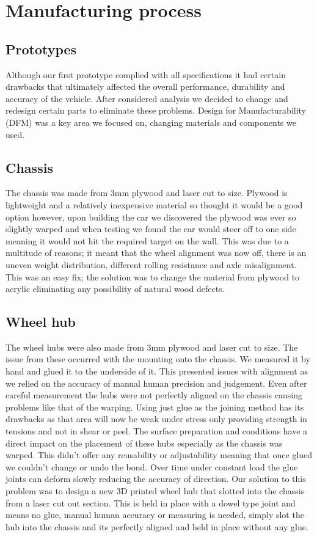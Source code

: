 \documentclass{article}
\begin{document}
\newpage
\section{Manufacturing process}

\subsection{Prototypes}
Although our first prototype complied with all specifications it had certain drawbacks that ultimately affected the overall performance, durability and accuracy of the vehicle. After considered analysis we decided to change and redesign certain parts to eliminate these problems. Design for Manufacturability (DFM) was a key area we focused on, changing materials and components we used. 
\subsection{Chassis}
The chassis was made from 3mm plywood and laser cut to size. Plywood is lightweight and a relatively inexpensive material so thought it would be a good option however, upon building the car we discovered the plywood was ever so slightly warped and when testing we found the car would steer off to one side meaning it would not hit the required target on the wall. This was due to a multitude of reasons; it meant that the wheel alignment was now off, there is an uneven weight distribution, different rolling resistance and axle misalignment. This was an easy fix; the solution was to change the material from plywood to acrylic eliminating any possibility of natural wood defects.  
\subsection{Wheel hub}
The wheel hubs were also made from 3mm plywood and laser cut to size. The issue from these occurred with the mounting onto the chassis. We measured it by hand and glued it to the underside of it. This presented issues with alignment as we relied on the accuracy of manual human precision and judgement. Even after careful measurement the hubs were not perfectly aligned on the chassis causing problems like that of the warping. Using just glue as the joining method has its drawbacks as that area will now be weak under stress only providing strength in tensions and not in shear or peel. The surface preparation and conditions have a direct impact on the placement of these hubs especially as the chassis was warped. This didn't offer any reusability or adjustability meaning that once glued we couldn't change or undo the bond. Over time under constant load the glue joints can deform slowly reducing the accuracy of direction. Our solution to this problem was to design a new 3D printed wheel hub that slotted into the chassis from a laser cut out section. This is held in place with a dowel type joint and means no glue, manual human accuracy or measuring is needed, simply slot the hub into the chassis and its perfectly aligned and held in place without any glue.  
\end{document}
